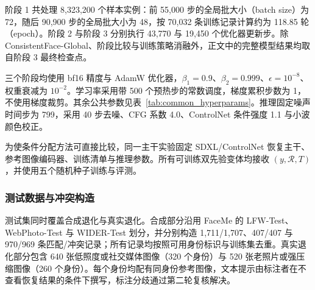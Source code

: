 \documentclass[journal]{IEEEtran}
\begin{document}
阶段 1 共处理 8,323,200 个样本实例：前 55,000 步的全局批大小（batch size）为 72，随后 90,900 步的全局批大小为 48，按 70,032 条训练记录计算约为 118.85 轮（epoch）。阶段 2 与阶段 3 分别执行 43,770 与 19,450 个优化器更新步。除 ConsistentFace-Global、阶段比较与训练策略消融外，正文中的完整模型结果均取自阶段 3 最终检查点。

三个阶段均使用 bf16 精度与 AdamW 优化器，$\beta_1=0.9$、$\beta_2=0.999$、$\epsilon=10^{-8}$、权重衰减为 $10^{-2}$。学习率采用带 500 个预热步的常数调度，梯度累积步数为 1，不使用梯度裁剪。其余公共参数见表~\ref{tab:common_hyperparams}。推理固定噪声时间步为 799，采用 40 步去噪、CFG 系数 4.0、ControlNet 条件强度 1.1 与小波颜色校正。

\begin{table}[!t]
\centering
\caption{模型与训练的公共超参数。}
\label{tab:common_hyperparams}
{\scriptsize
\setlength{\tabcolsep}{4pt}
}
\end{table}

为使条件分配方法可直接比较，同一主干实验固定 SDXL/ControlNet 恢复主干\cite{podell2023sdxl,zhang2023controlnet}、参考图像编码器、训练清单与推理参数。所有可训练双先验变体均接收 $(y,\mathcal{R},T)$，并使用五个随机种子训练与评测。

\subsubsection{测试数据与冲突构造}
测试集同时覆盖合成退化与真实退化。合成部分沿用 FaceMe 的 LFW-Test、WebPhoto-Test 与 WIDER-Test 划分\cite{liu2025faceme}，并分别构造 1,711/1,707、407/407 与 970/969 条匹配/冲突记录；所有记录均按照可用身份标识与训练集去重。真实退化部分包含 640 张低照度或社交媒体图像（320 个身份）与 520 张老照片或强压缩图像（260 个身份）。每个身份均配有同身份参考图像，文本提示由标注者在不查看恢复结果的条件下撰写，标注分歧通过第二轮复核解决。
\end{document}
